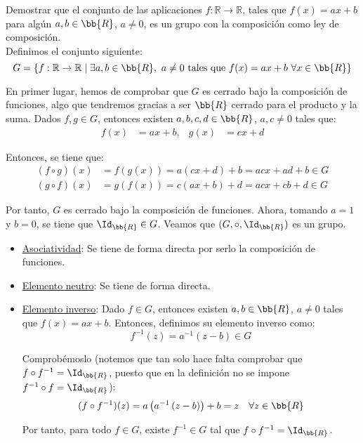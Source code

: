 \begin{ejercicio}\label{ej:2.9}
    Demostrar que el conjunto de las aplicaciones $f : \mathbb{R} \to \mathbb{R}$, tales que $f(x) = ax + b$ para algún $a,b\in \bb{R}$, $a\neq 0$, es un grupo con la composición como ley de composición.\\

    Definimos el conjunto siguiente:
    \begin{equation*}
        G = \{f : \mathbb{R} \to \mathbb{R} \mid \exists a,b\in \bb{R},~a\neq 0 \text{ tales que } f(x) = ax + b\ \forall x\in \bb{R}\}
    \end{equation*}

    En primer lugar, hemos de comprobar que $G$ es cerrado bajo la composición de funciones, algo que tendremos gracias a ser $\bb{R}$ cerrado para el producto y la suma. Dados $f, g\in G$, entonces existen $a,b,c,d\in \bb{R}$, $a,c\neq 0$ tales que:
    \begin{align*}
        f(x) &= ax + b, & g(x) &= cx + d
    \end{align*}

    Entonces, se tiene que:
    \begin{align*}
        (f\circ g)(x) &= f(g(x)) = a(cx + d) + b = acx + ad + b\in G\\
        (g\circ f)(x) &= g(f(x)) = c(ax + b) + d = acx + cb + d\in G
    \end{align*}
    
    Por tanto, $G$ es cerrado bajo la composición de funciones.
    Ahora, tomando $a=1$ y $b=0$, se tiene que $\Id_{\bb{R}}\in G$. Veamos que $(G,\circ, \Id_{\bb{R}})$ es un grupo.
    \begin{itemize}
        \item \ul{Asociatividad}: Se tiene de forma directa por serlo la composición de funciones.

        \item \ul{Elemento neutro}: Se tiene de forma directa.

        \item \ul{Elemento inverso}: Dado $f\in G$, entonces existen $a,b\in \bb{R}$, $a\neq 0$ tales que $f(x) = ax + b$.
        Entonces, definimos su elemento inverso como:
        \begin{equation*}
            f^{-1}(z) = a^{-1}\left(z - b\right)\in G
        \end{equation*}

        Comprobémoslo (notemos que tan solo hace falta comprobar que $f\circ f^{-1} = \Id_{\bb{R}}$, puesto que en la definición no se impone $f^{-1}\circ f = \Id_{\bb{R}}$):
        \begin{align*}
            (f\circ f^{-1})(z) &= a\left(a^{-1}\left(z - b\right)\right) + b = z& \forall z\in \bb{R}
        \end{align*}

        Por tanto, para todo $f\in G$, existe $f^{-1}\in G$ tal que $f\circ f^{-1}=\Id_{\bb{R}}$.
    \end{itemize}
\end{ejercicio}


